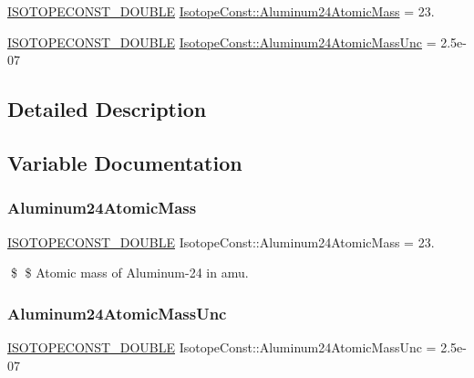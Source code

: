 \begin{DoxyCompactItemize}
\item 
\mbox{\hyperlink{group___isotope_const-_macros_ga8f45a7272ce02c0b4c65c44636ed719a}{I\+S\+O\+T\+O\+P\+E\+C\+O\+N\+S\+T\+\_\+\+D\+O\+U\+B\+LE}} \mbox{\hyperlink{group___isotope_const-_aluminum-_al24_gad4349698a4f6ce830993b5533cfa1a9c}{Isotope\+Const\+::\+Aluminum24\+Atomic\+Mass}} = 23.
\item 
\mbox{\hyperlink{group___isotope_const-_macros_ga8f45a7272ce02c0b4c65c44636ed719a}{I\+S\+O\+T\+O\+P\+E\+C\+O\+N\+S\+T\+\_\+\+D\+O\+U\+B\+LE}} \mbox{\hyperlink{group___isotope_const-_aluminum-_al24_ga04757d8f21d3e7bb1f32d2e689113d9c}{Isotope\+Const\+::\+Aluminum24\+Atomic\+Mass\+Unc}} = 2.\+5e-\/07
\end{DoxyCompactItemize}


\subsection{Detailed Description}


\subsection{Variable Documentation}
\mbox{\label{group___isotope_const-_aluminum-_al24_gad4349698a4f6ce830993b5533cfa1a9c}} 
\subsubsection{\texorpdfstring{Aluminum24\+Atomic\+Mass}{Aluminum24AtomicMass}}
{\footnotesize\ttfamily \mbox{\hyperlink{group___isotope_const-_macros_ga8f45a7272ce02c0b4c65c44636ed719a}{I\+S\+O\+T\+O\+P\+E\+C\+O\+N\+S\+T\+\_\+\+D\+O\+U\+B\+LE}} Isotope\+Const\+::\+Aluminum24\+Atomic\+Mass = 23.}

\$ \$ Atomic mass of Aluminum-\/24 in amu. \mbox{\label{group___isotope_const-_aluminum-_al24_ga04757d8f21d3e7bb1f32d2e689113d9c}} 
\subsubsection{\texorpdfstring{Aluminum24\+Atomic\+Mass\+Unc}{Aluminum24AtomicMassUnc}}
{\footnotesize\ttfamily \mbox{\hyperlink{group___isotope_const-_macros_ga8f45a7272ce02c0b4c65c44636ed719a}{I\+S\+O\+T\+O\+P\+E\+C\+O\+N\+S\+T\+\_\+\+D\+O\+U\+B\+LE}} Isotope\+Const\+::\+Aluminum24\+Atomic\+Mass\+Unc = 2.\+5e-\/07}

